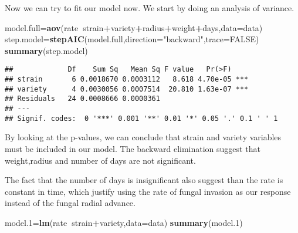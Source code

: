 \documentclass[
]{article}
\newenvironment{Shaded}{\begin{snugshade}}{\end{snugshade}}
\newcommand{\DataTypeTok}[1]{\textcolor[rgb]{0.13,0.29,0.53}{#1}}
\newcommand{\FloatTok}[1]{\textcolor[rgb]{0.00,0.00,0.81}{#1}}
\newcommand{\KeywordTok}[1]{\textcolor[rgb]{0.13,0.29,0.53}{\textbf{#1}}}
\newcommand{\NormalTok}[1]{#1}
\newcommand{\OperatorTok}[1]{\textcolor[rgb]{0.81,0.36,0.00}{\textbf{#1}}}
\newcommand{\OtherTok}[1]{\textcolor[rgb]{0.56,0.35,0.01}{#1}}
\newcommand{\StringTok}[1]{\textcolor[rgb]{0.31,0.60,0.02}{#1}}
\begin{document}
Now we can try to fit our model now. We start by doing an analysis of
variance.

\begin{Shaded}
\begin{Highlighting}[]
\NormalTok{model.full=}\KeywordTok{aov}\NormalTok{(rate}\OperatorTok{~}\NormalTok{strain}\OperatorTok{+}\NormalTok{variety}\OperatorTok{+}\NormalTok{radius}\OperatorTok{+}\NormalTok{weight}\OperatorTok{+}\NormalTok{days,}\DataTypeTok{data=}\NormalTok{data)}
\NormalTok{step.model=}\KeywordTok{stepAIC}\NormalTok{(model.full,}\DataTypeTok{direction=}\StringTok{"backward"}\NormalTok{,}\DataTypeTok{trace=}\OtherTok{FALSE}\NormalTok{)}
\KeywordTok{summary}\NormalTok{(step.model)}
\end{Highlighting}
\end{Shaded}

\begin{verbatim}
##             Df    Sum Sq   Mean Sq F value   Pr(>F)    
## strain       6 0.0018670 0.0003112   8.618 4.70e-05 ***
## variety      4 0.0030056 0.0007514  20.810 1.63e-07 ***
## Residuals   24 0.0008666 0.0000361                     
## ---
## Signif. codes:  0 '***' 0.001 '**' 0.01 '*' 0.05 '.' 0.1 ' ' 1
\end{verbatim}

By looking at the p-values, we can conclude that strain and variety
variables must be included in our model. The backward elimination
suggest that weight,radius and number of days are not significant.

The fact that the number of days is insignificant also suggest than the
rate is constant in time, which justify using the rate of fungal
invasion as our response instead of the fungal radial advance.

\begin{Shaded}
\begin{Highlighting}[]
\NormalTok{model}\FloatTok{.1}\NormalTok{=}\KeywordTok{lm}\NormalTok{(rate}\OperatorTok{~}\NormalTok{strain}\OperatorTok{+}\NormalTok{variety,}\DataTypeTok{data=}\NormalTok{data)}
\KeywordTok{summary}\NormalTok{(model}\FloatTok{.1}\NormalTok{)}
\end{Highlighting}
\end{Shaded}
\end{document}
